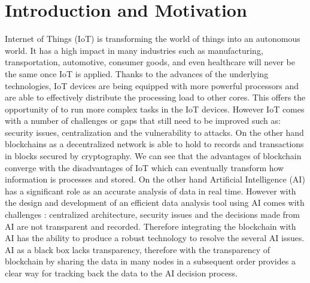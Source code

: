 \chapter{Introduction and Motivation}
\label{thesis:introduction}



Internet of Things (IoT) is transforming the world of things into an autonomous world. It has a high impact in many industries such as manufacturing, transportation, automotive, consumer goods, and even healthcare will never be the same
once IoT is applied. Thanks to the advances of the underlying technologies, IoT devices are being equipped with more powerful processors and are able to effectively distribute the processing load to other cores. This offers the opportunity of to run more complex tasks in the IoT devices. 
However IoT comes with a number of challenges or gaps  that still need to be improved such as: security issues, centralization and the vulnerability to attacks. 
On the other hand blockchains as a decentralized network is able to hold to records and transactions in blocks secured by cryptography. We can see that the advantages of blockchain converge with the disadvantages of IoT which can eventually transform how information is processes and stored. On the other hand Artificial Intelligence (AI) has a significant role as an accurate analysis of data in real time. However with the design and development of an efficient data analysis tool  using AI comes with challenges : centralized architecture, security issues and the decisions made from AI are not transparent and recorded. Therefore integrating the blockchain with AI has the ability to produce a robust technology to resolve the several AI issues. AI as a black box lacks transparency, therefore with the transparency of blockchain by sharing the data in many nodes in a subsequent order provides a clear way for tracking back the data to the AI decision process.   

